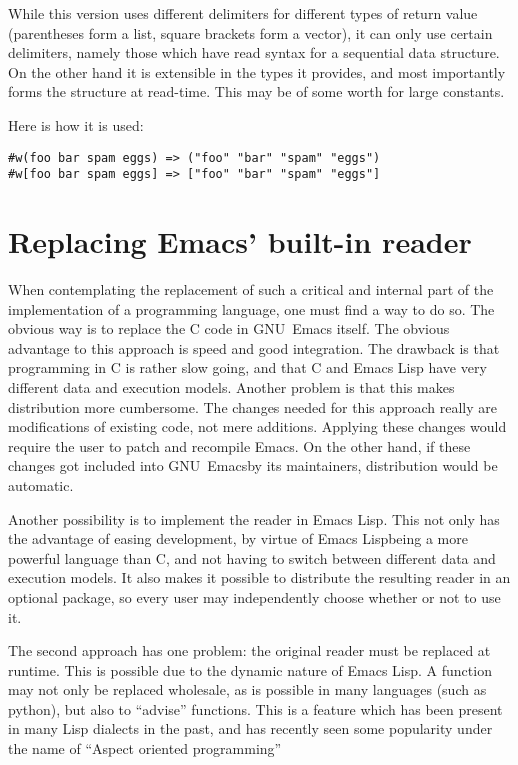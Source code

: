 \documentclass[a4paper,10pt,twoside]{article}
\newcommand{\el}{Emacs Lisp}
\newcommand{\emacs}{GNU~Emacs}
\begin{document}
While this version uses different delimiters for different types of return value
(parentheses form a list, square brackets form a vector), it can only use
certain delimiters, namely those which have read syntax for a sequential data
structure.  On the other hand it is extensible in the types it provides, and
most importantly forms the structure at read-time.  This may be of some worth
for large constants.

Here is how it is used:

\begin{lstlisting}[style=rubyinline]
#w(foo bar spam eggs) => ("foo" "bar" "spam" "eggs")
#w[foo bar spam eggs] => ["foo" "bar" "spam" "eggs"]
\end{lstlisting}

\section{Replacing Emacs’ built-in reader}
\label{sec:repl-reader}

When contemplating the replacement of such a critical and internal part of the
implementation of a programming language, one must find a way to do so.  The
obvious way is to replace the C code in \emacs{} itself.  The obvious advantage
to this approach is speed and good integration.  The drawback is that
programming in C is rather slow going, and that C and \el{} have very different
data and execution models.  Another problem is that this makes distribution more
cumbersome.  The changes needed for this approach really are modifications of
existing code, not mere additions.  Applying these changes would require the
user to patch and recompile Emacs.  On the other hand, if these changes got
included into \emacs by its maintainers, distribution would be automatic.

Another possibility is to implement the reader in \el.  This not only has the
advantage of easing development, by virtue of \el being a more powerful language
than C, and not having to switch between different data and execution models.
It also makes it possible to distribute the resulting reader in an optional
package, so every user may independently choose whether or not to use it.

The second approach has one problem: the original reader must be replaced at
runtime.  This is possible due to the dynamic nature of \el.  A function may not
only be replaced wholesale, as is possible in many languages (such as python),
but also to ``advise'' functions.  This is a feature which has been present in
many Lisp dialects in the past, and has recently seen some popularity under the
name of ``Aspect oriented programming''
\end{document}
